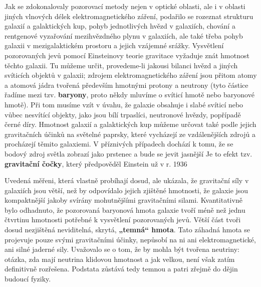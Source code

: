        Jak se zdokonalovaly pozorovací metody nejen v optické oblasti, ale i v oblasti jiných
        vlnových délek elektromagnetického záření, podařilo se rozeznat strukturu galaxií a
        galaktických kup, pohyb jednotlivých hvězd v galaxiích, chování a rentgenové vyzařování
        mezihvězdného plynu v galaxiích, ale také třeba pohyb galaxii v mezigalaktickém prostoru a
        jejich vzájemné srážky. Vysvětlení pozorovaných jevů pomocí Einsteinovy teorie gravitace
        vyžaduje znát hmotnost těchto galaxii. Tu můžeme určit, provedeme-li jakousi bilanci hvězd a
        jiných svíticích objektů v galaxii; zdrojem elektromagnetického záření jsou přitom atomy a
        atomová jádra tvořená především hmotnými protony a neutrony (tyto částice řadíme mezi tzv.
        \textbf{baryony}, proto někdy mluvíme o svíticí hmotě nebo baryonové hmotě). Při tom musíme
        vzít v úvahu, že galaxie obsahuje i slabé svíticí nebo vůbec nesvítící objekty, jako jsou
        bílí trpaslíci, neutronové hvězdy, popřípadě černé díry. Hmotnost galaxií a galaktických kup
        můžeme určovat také podle jejich gravitačních účinků na světelné paprsky, které vycházejí ze
        vzdálenějších zdrojů a procházejí těmito galaxiemi. V příznivých případech dochází k tomu,
        že se bodový zdroj světla zobrazí jako prstenec a bude se jevit jasnější Je to efekt tzv.
        \textbf{gravitační čočky}, který předpověděl Einstein už v r. 1936

        Uvedená měřeni, která vlastně probíhají dosud, ale ukázala, že gravitační síly v galaxiích
        jsou větší, než by odpovídalo jejich zjištěné hmotnosti, že galaxie jsou kompaktnější jakoby
        svírány mohutnějšími gravitačními silami. Kvantitativně bylo odhadnuto, že pozorovaná
        baryonová hmota galaxie tvoří méně než jednu čtvrtinu hmotnosti potřebné k vysvětlení
        pozorovaných jevů. Větší část tvoři dosud nezjištěná neviditelná, skrytá, \textbf{„temná“
        hmota}. Tato záhadná hmota se projevuje pouze svými gravitačními účinky, nepůsobí na ni ani
        elektromagnetické, ani silné jaderné sily. Uvažovalo se o tom, že by mohla být tvořena
        neutriny: otázka, zda mají neutrina klidovou hmotnost a jak velkou, není však zatím
        definitivně rozřešena. Podstata  zůstává tedy temnou a patri zřejmě do dějin
        budoucí fyziky. 

